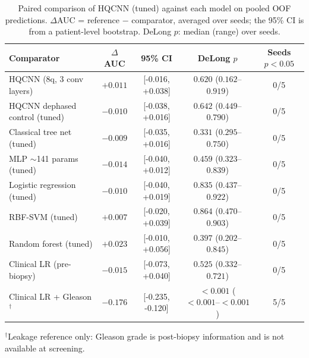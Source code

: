 \begin{table}[t]
\centering
\caption{Paired comparison of HQCNN (tuned) against each model on pooled OOF predictions. $\Delta$AUC = reference $-$ comparator, averaged over seeds; the 95\% CI is from a patient-level bootstrap. DeLong $p$: median (range) over seeds.}
\label{tab:v3_delong}
\small
\begin{tabular}{lcccc}
\toprule
Comparator & $\Delta$AUC & 95\% CI & DeLong $p$ & Seeds $p<0.05$ \\
\midrule
HQCNN (8q, 3 conv layers) & $+0.011$ & [-0.016, +0.038] & $0.620$ ($0.162$--$0.919$) & 0/5 \\
HQCNN dephased control (tuned) & $-0.010$ & [-0.038, +0.016] & $0.642$ ($0.449$--$0.790$) & 0/5 \\
Classical tree net (tuned) & $-0.009$ & [-0.035, +0.016] & $0.331$ ($0.295$--$0.750$) & 0/5 \\
MLP $\sim$141 params (tuned) & $-0.014$ & [-0.040, +0.012] & $0.459$ ($0.323$--$0.839$) & 0/5 \\
Logistic regression (tuned) & $-0.010$ & [-0.040, +0.019] & $0.835$ ($0.437$--$0.922$) & 0/5 \\
RBF-SVM (tuned) & $+0.007$ & [-0.020, +0.039] & $0.864$ ($0.470$--$0.903$) & 0/5 \\
Random forest (tuned) & $+0.023$ & [-0.010, +0.056] & $0.397$ ($0.202$--$0.845$) & 0/5 \\
Clinical LR (pre-biopsy) & $-0.015$ & [-0.073, +0.040] & $0.525$ ($0.332$--$0.721$) & 0/5 \\
Clinical LR + Gleason$^{\dagger}$ & $-0.176$ & [-0.235, -0.120] & $<0.001$ ($<0.001$--$<0.001$) & 5/5 \\
\bottomrule
\end{tabular}
\par\smallskip\footnotesize $^{\dagger}$Leakage reference only: Gleason grade is post-biopsy information and is not available at screening.
\end{table}
